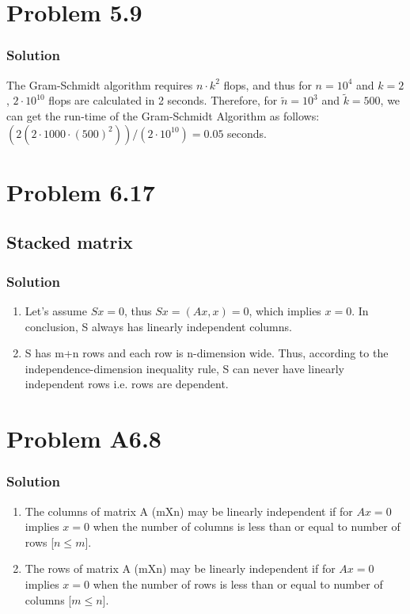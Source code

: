 \documentclass{article}
\begin{document}
\section*{Problem 5.9}
\subsubsection*{Solution}
The Gram-Schmidt algorithm requires $n\cdot k^2$ flops, and thus for $n=10^4$ and $k=2$, $2\cdot 10^{10}$ flops are calculated in 2 seconds. Therefore, for $\widetilde{n}=10^3$ and $\widetilde{k}=500$, we can get the run-time of the Gram-Schmidt Algorithm as follows:
$(2(2\cdot1000\cdot(500)^2))/(2\cdot 10^{10}) = 0.05$ seconds.
\section*{Problem 6.17}
\subsection*{Stacked matrix}
\subsubsection*{Solution}
\begin{enumerate}[label=\alph*]
    \item Let's assume $Sx=0$, thus $Sx = (Ax,x) = 0$, which implies $x=0$. In conclusion, S always has linearly independent columns.
    \item S has m+n rows and each row is n-dimension wide. Thus, according to the independence-dimension inequality rule, S can never have linearly independent rows i.e. rows are dependent.
\end{enumerate}
\section*{Problem A6.8}
\subsubsection*{Solution}
\begin{enumerate}[label=\alph*]
    \item The columns of matrix A (mXn) may be linearly independent if for $Ax=0$ implies $x=0$ when the number of columns is less than or equal to number of rows [$n\leq m$]. 
    \item The rows of matrix A (mXn) may be linearly independent if for $Ax=0$ implies $x=0$ when the number of rows is less than or equal to number of columns [$m \leq n$].
\end{enumerate}
\end{document}

